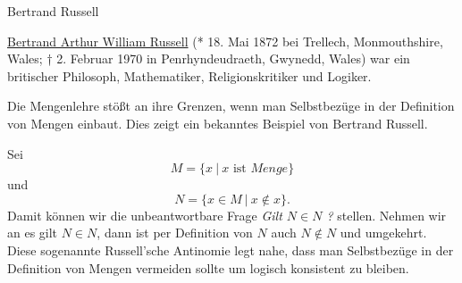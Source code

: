 \documentclass[letterpaper,10pt,english]{jupyterBook}
\begin{document}
\begin{emphBox}{Bertrand Russell}{}

\href{https://de.wikipedia.org/wiki/Bertrand\_Russell}{Bertrand Arthur William Russell} (* 18. Mai 1872 bei Trellech, Monmouthshire, Wales; † 2. Februar 1970 in Penrhyndeudraeth, Gwynedd, Wales) war ein britischer Philosoph, Mathematiker, Religionskritiker und Logiker.
\end{emphBox}

Die Mengenlehre stößt an ihre Grenzen, wenn man Selbstbezüge in der Definition von Mengen einbaut. Dies zeigt ein bekanntes Beispiel von Bertrand Russell.

Sei
\begin{equation*}
 M=\{ x ~|~x \text{ ist } Menge \}
\end{equation*}
und
\begin{equation*}
N = \{x \in M~|~x \notin x\}.
\end{equation*}
Damit können wir die unbeantwortbare Frage \emph{Gilt \(N \in N\) ?} stellen. Nehmen wir an es gilt \(N \in N\), dann ist per Definition von \(N\) auch \(N \notin N\) und umgekehrt. Diese sogenannte Russell’sche Antinomie legt nahe, dass man Selbstbezüge in der Definition von Mengen vermeiden sollte um logisch konsistent zu bleiben.
\end{document}
